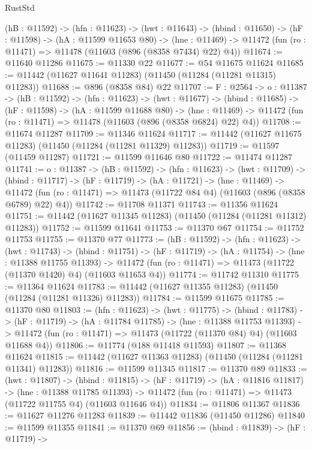 \begin{lexlean}{RustStd}
\begin{coremodule}
  (hB : @11592) ->
  (hfn : @11623) ->
  (hwt : @11643) ->
  (hbind : @11650) ->
  (hF : @11598) ->
  (hA : @11599 @11653 @80) ->
  (hne : @11469) -> @11472 (fun (ro : @11471) => @11478 (@11603 (@896 (@8358 @7434) @22) @4))
@11674 := @11640 @11286
@11675 := @11330 @22
@11677 := @54 @11675 @11624
@11685 := @11442 (@11627 @11641 @11283) (@11450 (@11284 (@11281 @11315) @11283))
@11688 := @896 (@8358 @84) @22
@11707 := {F : @2564} ->
  {o : @11387} ->
  (hB : @11592) ->
  (hfn : @11623) ->
  (hwt : @11677) ->
  (hbind : @11685) ->
  (hF : @11598) ->
  (hA : @11599 @11688 @80) ->
  (hne : @11469) -> @11472 (fun (ro : @11471) => @11478 (@11603 (@896 (@8358 @6824) @22) @4))
@11708 := @11674 @11287
@11709 := @11346 @11624
@11717 := @11442 (@11627 @11675 @11283) (@11450 (@11284 (@11281 @11329) @11283))
@11719 := @11597 (@11459 @11287)
@11721 := @11599 @11646 @80
@11722 := @11474 @11287
@11741 := {o : @11387} ->
  (hB : @11592) ->
  (hfn : @11623) ->
  (hwt : @11709) ->
  (hbind : @11717) ->
  (hF : @11719) ->
  (hA : @11721) ->
  (hne : @11469) ->
  @11472 (fun (ro : @11471) => @11473 (@11722 @84 @4) (@11603 (@896 (@8358 @6789) @22) @4))
@11742 := @11708 @11371
@11743 := @11356 @11624
@11751 := @11442 (@11627 @11345 @11283) (@11450 (@11284 (@11281 @11312) @11283))
@11752 := @11599 @11641
@11753 := @11370 @67
@11754 := @11752 @11753
@11755 := @11370 @77
@11773 := (hB : @11592) ->
  (hfn : @11623) ->
  (hwt : @11743) ->
  (hbind : @11751) ->
  (hF : @11719) ->
  (hA : @11754) ->
  (hne : @11388 @11755 @11393) ->
  @11472 (fun (ro : @11471) => @11473 (@11722 (@11370 @1420) @4) (@11603 @11653 @4))
@11774 := @11742 @11310
@11775 := @11364 @11624
@11783 := @11442 (@11627 @11355 @11283) (@11450 (@11284 (@11281 @11326) @11283))
@11784 := @11599 @11675
@11785 := @11370 @80
@11803 := (hfn : @11623) ->
  (hwt : @11775) ->
  (hbind : @11783) ->
  (hF : @11719) ->
  (hA : @11784 @11785) ->
  (hne : @11388 @11753 @11393) ->
  @11472 (fun (ro : @11471) => @11473 (@11722 (@11370 @84) @4) (@11603 @11688 @4))
@11806 := @11774 (@188 @11418 @11593)
@11807 := @11368 @11624
@11815 := @11442 (@11627 @11363 @11283) (@11450 (@11284 (@11281 @11341) @11283))
@11816 := @11599 @11345
@11817 := @11370 @89
@11833 := (hwt : @11807) ->
  (hbind : @11815) ->
  (hF : @11719) ->
  (hA : @11816 @11817) ->
  (hne : @11388 @11785 @11393) ->
  @11472 (fun (ro : @11471) => @11473 (@11722 @11755 @4) (@11603 @11646 @4))
@11834 := @11806 @11367
@11836 := @11627 @11276 @11283
@11839 := @11442 @11836 (@11450 @11286)
@11840 := @11599 @11355
@11841 := @11370 @69
@11856 := (hbind : @11839) ->
  (hF : @11719) ->

\end{coremodule}
\end{lexlean}
